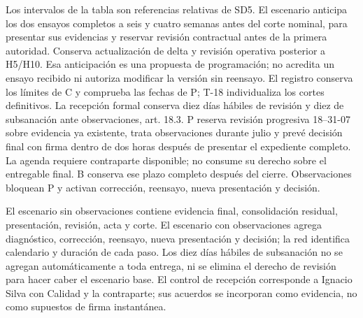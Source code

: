 Los intervalos de la tabla son referencias relativas de SD5. El escenario anticipa los dos ensayos completos a seis y cuatro semanas antes del corte nominal, para presentar sus evidencias y reservar revisión contractual antes de la primera autoridad. Conserva actualización de delta y revisión operativa posterior a H5/H10. Esa anticipación es una propuesta de programación; no acredita un ensayo recibido ni autoriza modificar la versión sin reensayo. El registro conserva los límites de C y comprueba las fechas de P; T-18 individualiza los cortes definitivos.
La recepción formal conserva diez días hábiles de revisión y diez de subsanación ante observaciones, art. 18.3. P reserva revisión progresiva 18--31-07 sobre evidencia ya existente, trata observaciones durante julio y prevé decisión final con firma dentro de dos horas después de presentar el expediente completo. La agenda requiere contraparte disponible; no consume su derecho sobre el entregable final. B conserva ese plazo completo después del cierre. Observaciones bloquean P y activan corrección, reensayo, nueva presentación y decisión.

El escenario sin observaciones contiene evidencia final, consolidación residual, presentación, revisión, acta y corte. El escenario con observaciones agrega diagnóstico, corrección, reensayo, nueva presentación y decisión; la red identifica calendario y duración de cada paso. Los diez días hábiles de subsanación no se agregan automáticamente a toda entrega, ni se elimina el derecho de revisión para hacer caber el escenario base. El control de recepción corresponde a Ignacio Silva con Calidad y la contraparte; sus acuerdos se incorporan como evidencia, no como supuestos de firma instantánea.

